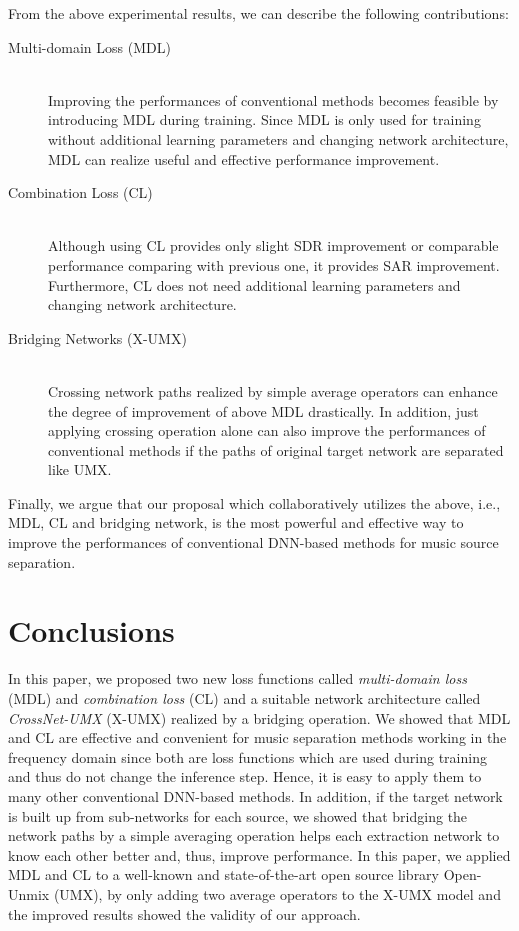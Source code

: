 \documentclass{article}
\begin{document}
From the above experimental results, we can describe the following contributions:
\begin{description}
   \item[Multi-domain Loss (MDL)]\mbox{}\\
        Improving the performances of conventional methods becomes feasible by introducing MDL during training.
        Since MDL is only used for training without additional learning parameters and changing network architecture, MDL can realize useful and effective performance improvement.
    \item[Combination Loss (CL)]\mbox{}\\
        Although using CL provides only slight SDR improvement or comparable performance comparing with previous one, it provides SAR improvement.
        Furthermore, CL does not need additional learning parameters and changing network architecture.
\item[Bridging Networks (X-UMX)]\mbox{}\\
		Crossing network paths realized by simple average operators can enhance the degree of improvement of above MDL drastically.
		In addition, just applying crossing operation alone can also improve the performances of conventional methods
if the paths of original target network are separated like UMX.
\end{description}
\noindent
Finally, we argue that our proposal which collaboratively utilizes the above, i.e., MDL, CL and bridging network, is the most powerful and effective way to improve the performances of conventional DNN-based methods for music source separation.
\fi

\vspace{-3mm}
\section{Conclusions}
\label{sec:concludions}
\vspace{-2mm}
In this paper, we proposed two new loss functions called \emph{multi-domain loss} (MDL) and \emph{combination loss} (CL) and a suitable network architecture called \emph{CrossNet-UMX} (X-UMX) realized by a bridging operation.
We showed that MDL and CL are effective and convenient for music separation methods working in the frequency domain since both are loss functions which are used during training and thus do not change the inference step.
Hence, it is easy to apply them to many other conventional DNN-based methods.
In addition, if the target network is built up from sub-networks for each source, we showed that bridging the network paths by a simple averaging operation helps each extraction network to know each other better and, thus, improve performance.
In this paper, we applied MDL and CL to a well-known and state-of-the-art open source library Open-Unmix (UMX), by only adding two average operators to the X-UMX model and the improved results showed the validity of our approach. 

\clearpage


\end{document}

